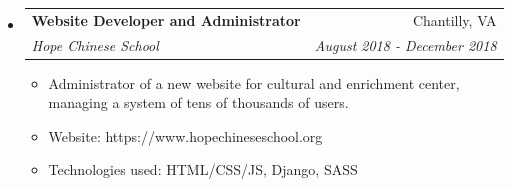\documentclass[letterpaper,11pt]{article}
\makeatletter
\newcommand{\resitem}[1]{\item #1 \vspace{-2pt}}
\newcommand{\ressubheading}[4]{
\begin{tabular*}{7.0in}{l@{\extracolsep{\fill}}r}
		\textbf{#1} & #2 \\
		\textit{#3} & \textit{#4} \\
\end{tabular*}\vspace{-6pt}}
\makeatother
\begin{document}
\begin{itemize}
\item
    \ressubheading{Website Developer and Administrator}{Chantilly, VA}{Hope Chinese School}{August 2018 - December 2018}
	\begin{itemize}
		\resitem{Administrator of a new website for cultural and enrichment center, managing a system of tens of thousands of users.}
		\resitem{Website: https://www.hopechineseschool.org}
		\resitem{Technologies used: HTML/CSS/JS, Django, SASS}
	\end{itemize}
\end{itemize}
\end{document}
